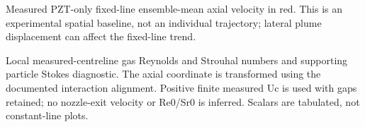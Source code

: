 \caption{Measured PZT-only fixed-line ensemble-mean axial velocity in red. This is an experimental spatial baseline, not an individual trajectory; lateral plume displacement can affect the fixed-line trend.}

\caption{Local measured-centreline gas Reynolds and Strouhal numbers and supporting particle Stokes diagnostic. The axial coordinate is transformed using the documented interaction alignment. Positive finite measured Uc is used with gaps retained; no nozzle-exit velocity or Re0/Sr0 is inferred. Scalars are tabulated, not constant-line plots.}

